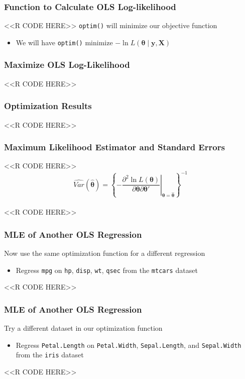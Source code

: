 \documentclass{beamer}
\begin{document}
\begin{frame}[fragile]\frametitle{Function to Calculate OLS Log-likelihood}
    <<R CODE HERE>>
    \vspace{1ex}
    \texttt{optim()} will minimize our objective function
    \begin{itemize}
        \item We will have \texttt{optim()} minimize $-\ln L(\bm{\theta} \mid \bm{y}, \bm{X})$
    \end{itemize}
\end{frame}

\begin{frame}[fragile]\frametitle{Maximize OLS Log-Likelihood}
    <<R CODE HERE>>
\end{frame}

\begin{frame}[fragile]\frametitle{Optimization Results}
    <<R CODE HERE>>
\end{frame}

\begin{frame}[fragile]\frametitle{Maximum Likelihood Estimator and Standard Errors}
    <<R CODE HERE>>
    \vspace{1ex}
    $$\widehat{Var}(\widehat{\bm{\theta}}) = \left\{ \left. -\frac{\partial^2 \ln L(\bm{\theta})}{\partial \bm{\theta} \partial \bm{\theta}'} \right\vert_{\bm{\theta} = \widehat{\bm{\theta}}} \right\}^{-1}$$ \\
    \vspace{1ex}
    <<R CODE HERE>>
\end{frame}

\begin{frame}[fragile]\frametitle{MLE of Another OLS Regression}
    Now use the same optimization function for a different regression
    \begin{itemize}
        \item Regress \texttt{mpg} on \texttt{hp}, \texttt{disp}, \texttt{wt}, \texttt{qsec} from the \texttt{mtcars} dataset
    \end{itemize}
    <<R CODE HERE>>
\end{frame}

\begin{frame}[fragile]\frametitle{MLE of Another OLS Regression}
    Try a different dataset in our optimization function
    \begin{itemize}
        \item Regress \texttt{Petal.Length} on \texttt{Petal.Width}, \texttt{Sepal.Length}, and \texttt{Sepal.Width} from the \texttt{iris} dataset
    \end{itemize}
    <<R CODE HERE>>
\end{frame}
\end{document}
